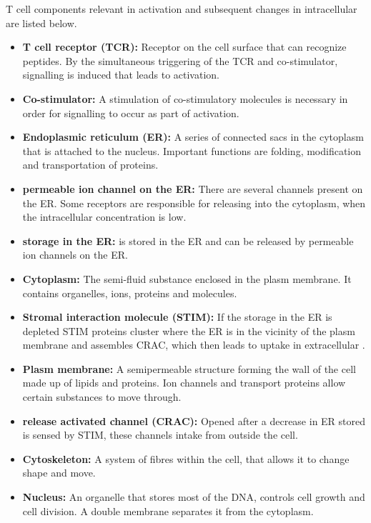 T cell components relevant in activation and subsequent changes in intracellular \Calcium are listed below.

\begin{itemize}
	\item \textbf{T cell receptor (TCR):} Receptor on the cell surface that can recognize peptides. By the simultaneous triggering of the TCR and co-stimulator, signalling is induced that leads to activation.
	\item \textbf{Co-stimulator:} A stimulation of co-stimulatory molecules is necessary in order for signalling to occur as part of activation.
	\item \textbf{Endoplasmic reticulum (ER):} A series of connected sacs in the cytoplasm that is attached to the nucleus. Important functions are folding, modification and transportation of proteins.\cite{Rogers2024}
	\item \textbf{\Calcium permeable ion channel on the ER:} There are several \Calcium channels present on the ER. Some receptors are responsible for releasing \Calcium into the cytoplasm, when the intracellular \Calcium concentration is low. \cite{Schwarz2016}
	\item \textbf{\Calcium storage in the ER:} \Calcium is stored in the ER and can be released by \Calcium permeable ion channels on the ER.
	\item \textbf{Cytoplasm:} The semi-fluid substance enclosed in the plasm membrane. It contains organelles, ions, proteins and molecules.
	\item \textbf{Stromal interaction molecule (STIM):} If the \Calcium storage in the ER is depleted STIM proteins cluster where the ER is in the vicinity of the plasm membrane and assembles CRAC, which then leads to uptake in extracellular \Calcium. \cite{Schwarz2016}
	\item \textbf{Plasm membrane:} A semipermeable structure forming the wall of the cell made up of lipids and proteins. Ion channels and transport proteins allow certain substances to move through.\cite{Ganong2012}
	\item \textbf{\Calcium release activated \Calcium channel (CRAC):} Opened after a decrease in ER stored \Calcium is sensed by STIM, these channels intake \Calcium from outside the cell.\cite{Stathopulos2013}
	\item \textbf{Cytoskeleton:} A system of fibres within the cell, that allows it to change shape and move.\cite{Ganong2012}
	\item \textbf{Nucleus:} An organelle that stores most of the DNA, controls cell growth and cell division. A double membrane separates it from the cytoplasm.\cite{cooper2022}
\end{itemize}

